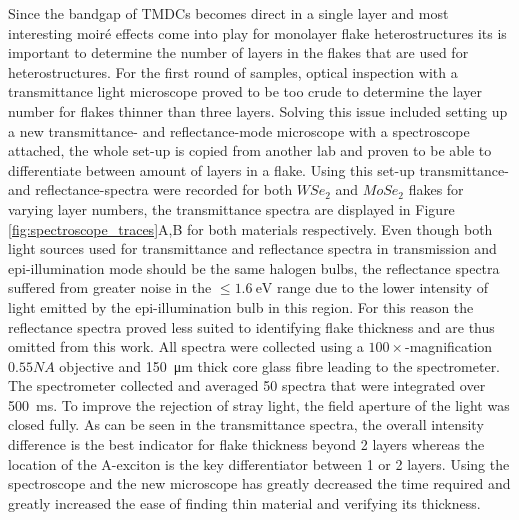 \vspace{1cm}


Since the bandgap of TMDCs becomes direct in a single layer and most interesting moiré effects come into play for monolayer flake heterostructures its is important to determine the number of layers in the flakes that are used for heterostructures. For the first round of samples, optical inspection with a transmittance light microscope proved to be too crude to determine the layer number for flakes thinner than three layers.
Solving this issue included setting up a new transmittance- and reflectance-mode microscope with a spectroscope attached, the whole set-up is copied from another lab and proven to be able to differentiate between amount of layers in a flake. \cite{frisendaMicroreflectanceTransmittanceSpectroscopy2017,niuThicknessDependentDifferentialReflectance2018}
Using this set-up transmittance- and reflectance-spectra were recorded for both $WSe_2$ and $MoSe_2$ flakes for varying layer numbers, the transmittance spectra are displayed in Figure \ref{fig:spectroscope_traces}A,B for both materials respectively. Even though both light sources used for transmittance and reflectance spectra in transmission and epi-illumination mode should be the same halogen bulbs, the reflectance spectra suffered from greater noise in the $\leq \SI{1.6}{\electronvolt}$ range due to the lower intensity of light emitted by the epi-illumination bulb in this region. For this reason the reflectance spectra proved less suited to identifying flake thickness and are thus omitted from this work.
All spectra were collected using a $100\times$-magnification $0.55NA$ objective and \SI{150}{\micro\meter} thick core glass fibre leading to the spectrometer. The spectrometer collected and averaged 50 spectra that were integrated over \SI{500}{\milli\second}. To improve the rejection of stray light, the field aperture of the light was closed fully.
As can be seen in the transmittance spectra, the overall intensity difference is the best indicator for flake thickness beyond 2 layers whereas the location of the A-exciton is the key differentiator between 1 or 2 layers.
Using the spectroscope and the new microscope has greatly decreased the time required and greatly increased the ease of finding thin material and verifying its thickness.

